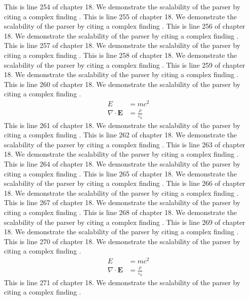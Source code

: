 This is line 254 of chapter 18. We demonstrate the scalability of the parser by citing a complex finding \cite{ref18_254}.
This is line 255 of chapter 18. We demonstrate the scalability of the parser by citing a complex finding \cite{ref18_255}.
This is line 256 of chapter 18. We demonstrate the scalability of the parser by citing a complex finding \cite{ref18_256}.
This is line 257 of chapter 18. We demonstrate the scalability of the parser by citing a complex finding \cite{ref18_257}.
This is line 258 of chapter 18. We demonstrate the scalability of the parser by citing a complex finding \cite{ref18_258}.
This is line 259 of chapter 18. We demonstrate the scalability of the parser by citing a complex finding \cite{ref18_259}.
This is line 260 of chapter 18. We demonstrate the scalability of the parser by citing a complex finding \cite{ref18_260}.
\begin{align*}
  E &= mc^2 \\
  \nabla \cdot \mathbf{E} &= \frac{\rho}{\varepsilon_0}
\end{align*}
This is line 261 of chapter 18. We demonstrate the scalability of the parser by citing a complex finding \cite{ref18_261}.
This is line 262 of chapter 18. We demonstrate the scalability of the parser by citing a complex finding \cite{ref18_262}.
This is line 263 of chapter 18. We demonstrate the scalability of the parser by citing a complex finding \cite{ref18_263}.
This is line 264 of chapter 18. We demonstrate the scalability of the parser by citing a complex finding \cite{ref18_264}.
This is line 265 of chapter 18. We demonstrate the scalability of the parser by citing a complex finding \cite{ref18_265}.
This is line 266 of chapter 18. We demonstrate the scalability of the parser by citing a complex finding \cite{ref18_266}.
This is line 267 of chapter 18. We demonstrate the scalability of the parser by citing a complex finding \cite{ref18_267}.
This is line 268 of chapter 18. We demonstrate the scalability of the parser by citing a complex finding \cite{ref18_268}.
This is line 269 of chapter 18. We demonstrate the scalability of the parser by citing a complex finding \cite{ref18_269}.
This is line 270 of chapter 18. We demonstrate the scalability of the parser by citing a complex finding \cite{ref18_270}.
\begin{align*}
  E &= mc^2 \\
  \nabla \cdot \mathbf{E} &= \frac{\rho}{\varepsilon_0}
\end{align*}
This is line 271 of chapter 18. We demonstrate the scalability of the parser by citing a complex finding \cite{ref18_271}.
